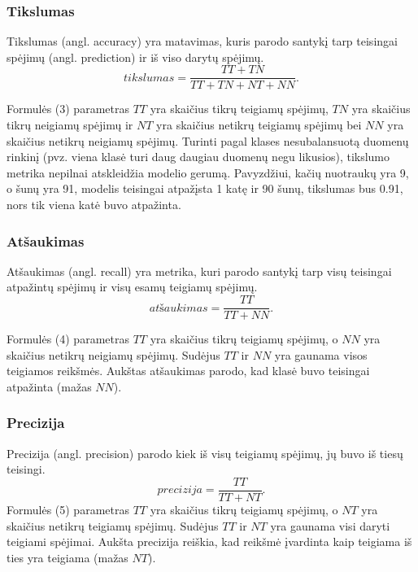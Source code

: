 \documentclass{VUMIFPSbakalaurinis}
\begin{document}
\subsubsection{Tikslumas}
Tikslumas (angl. accuracy) yra matavimas, kuris parodo santykį tarp teisingai spėjimų (angl. prediction) ir iš viso darytų spėjimų.
\begin{equation}
tikslumas = \frac{TT + TN}{TT + TN + NT + NN}.
\end{equation}

Formulės (3) parametras \(TT\) yra skaičius tikrų teigiamų spėjimų, \(TN\) yra skaičius tikrų neigiamų spėjimų ir \(NT\) yra skaičius netikrų teigiamų spėjimų bei \(NN\) yra skaičius netikrų neigiamų spėjimų.
Turinti pagal klases nesubalansuotą duomenų rinkinį (pvz. viena klasė turi daug daugiau duomenų negu likusios), tikslumo metrika nepilnai atskleidžia modelio gerumą. Pavyzdžiui, kačių nuotraukų yra 9, o šunų yra 91, modelis teisingai atpažįsta 1 katę ir 90 šunų, tikslumas bus 0.91, nors tik viena katė buvo atpažinta. 

\subsubsection{Atšaukimas}
Atšaukimas (angl. recall) yra metrika, kuri parodo santykį tarp visų teisingai atpažintų spėjimų ir visų esamų teigiamų spėjimų.
\begin{equation}
atšaukimas = \frac{TT}{TT + NN}.
\end{equation}

Formulės (4) parametras \(TT\) yra skaičius tikrų teigiamų spėjimų, o \(NN\) yra skaičius netikrų neigiamų spėjimų. Sudėjus \(TT\) ir \(NN\) yra gaunama visos teigiamos reikšmės.
Aukštas atšaukimas parodo, kad klasė buvo teisingai atpažinta (mažas \(NN\)).

\subsubsection{Precizija}
Precizija (angl. precision) parodo kiek iš visų teigiamų spėjimų, jų buvo iš tiesų teisingi. 
\begin{equation}
precizija = \frac{TT}{TT + NT}.
\end{equation}
Formulės (5) parametras \(TT\) yra skaičius tikrų teigiamų spėjimų, o \(NT\) yra skaičius netikrų teigiamų spėjimų. Sudėjus \(TT\) ir \(NT\) yra gaunama visi daryti teigiami spėjimai.
Aukšta precizija reiškia, kad reikšmė įvardinta kaip teigiama iš ties yra teigiama (mažas \(NT\)).
\end{document}
